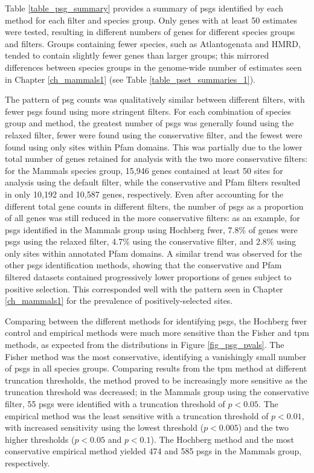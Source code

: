 Table \ref{table_psg_summary} provides a summary of \acp{psg}
identified by each method for each \sw filter and species group. Only
genes with at least 50 \sw estimates were tested, resulting in
different numbers of genes for different species groups and \sw
filters. Groups containing fewer species, such as Atlantogenata and
HMRD, tended to contain slightly fewer genes than larger groups; this
mirrored differences between species groups in the genome-wide number
of \sw estimates seen in Chapter \ref{ch_mammals1} (see Table
\ref{table_pset_summaries_1}).

The pattern of \ac{psg} counts was qualitatively similar between
different \sw filters, with fewer \acp{psg} found using more stringent
filters. For each combination of species group and method, the
greatest number of \acp{psg} was generally found using the relaxed
filter, fewer were found using the conservative filter, and the fewest
were found using only sites within Pfam domains. This was partially
due to the lower total number of genes retained for analysis with the
two more conservative filters: for the Mammals species group, 15,946
genes contained at least 50 sites for analysis using the default
filter, while the conservative and Pfam filters resulted in only
10,192 and 10,587 genes, respectively. Even after accounting for the
different total gene counts in different filters, the number of
\acp{psg} as a proportion of all genes was still reduced in the more
conservative filters: as an example, for \acp{psg} identified in the
Mammals group using Hochberg \ac{fwer}, 7.8\% of genes were \acp{psg}
using the relaxed filter, 4.7\% using the conservative filter, and
2.8\% using only sites within annotated Pfam domains. A similar trend
was observed for the other \acp{psg} identification methods, showing
that the conservative and Pfam filtered datasets contained
progressively lower proportions of genes subject to positive
selection. This corresponded well with the pattern seen in Chapter
\ref{ch_mammals1} for the prevalence of positively-selected sites.

Comparing between the different methods for identifying \acp{psg}, the
Hochberg \ac{fwer} control and empirical \pv methods were much
more sensitive than the Fisher and \ac{tpm} methods, as expected from
the \pv distributions in Figure \ref{fig_psg_pvals}. The Fisher
method was the most conservative, identifying a vanishingly small
number of \acp{psg} in all species groups. Comparing results from the
\ac{tpm} method at different truncation thresholds, the method proved
to be increasingly more sensitive as the truncation threshold was
decreased; in the Mammals group using the conservative filter, 55
\acp{psg} were identified with a truncation threshold of $p<0.05$. The
empirical method was the least sensitive with a truncation threshold
of $p<0.01$, with increased sensitivity using the lowest threshold
($p<0.005$) and the two higher thresholds ($p<0.05$ and $p<0.1$). The
Hochberg method and the most conservative empirical method yielded 474
and 585 \acp{psg} in the Mammals group, respectively.

